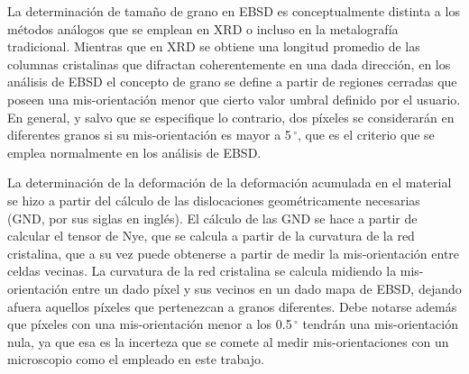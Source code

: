 La determinación de tamaño de grano en EBSD es conceptualmente distinta a los métodos análogos que se emplean en XRD o incluso en la metalografía tradicional.
Mientras que en XRD se obtiene una longitud promedio de las columnas cristalinas que difractan coherentemente en una dada dirección, en los análisis de EBSD el concepto de grano se define a partir de regiones cerradas que poseen una mis-orientación menor que cierto valor umbral definido por el usuario.
En general, y salvo que se especifique lo contrario, dos píxeles se considerarán en diferentes granos si su mis-orientación es mayor a 5\,$^{\circ}$, que es el criterio que se emplea normalmente en los análisis de EBSD.

La determinación de la deformación de la deformación acumulada en el material se hizo a partir del cálculo de las dislocaciones geométricamente necesarias (GND, por sus siglas en inglés).
El cálculo de las GND se hace a partir de calcular el tensor de Nye\cite{Nye1953}, que se calcula a partir de la curvatura de la red cristalina, que a su vez puede obtenerse a partir de medir la mis-orientación entre celdas vecinas\cite{Pantleon2008}.
La curvatura de la red cristalina se calcula midiendo la mis-orientación entre un dado píxel y sus vecinos en un dado mapa de EBSD, dejando afuera aquellos píxeles que pertenezcan a granos diferentes.
Debe notarse además que píxeles con una mis-orientación menor a los 0.5\,$^{\circ}$ tendrán una mis-orientación nula, ya que esa es la incerteza que se comete al medir mis-orientaciones con un microscopio como el empleado en este trabajo.
